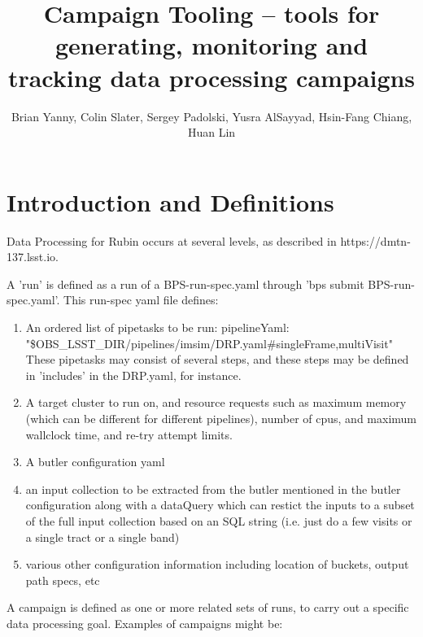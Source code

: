 \documentclass[DM,authoryear,toc]{lsstdoc}
\title{Campaign Tooling -- tools for generating, monitoring and tracking data processing campaigns}
\author{%
Brian Yanny, Colin Slater, Sergey Padolski, Yusra AlSayyad, Hsin-Fang Chiang, Huan Lin
}
\date{\vcsDate}
\begin{document}
\maketitle


\section{Introduction and Definitions}

Data Processing for Rubin occurs at several levels,
as described in https://dmtn-137.lsst.io. 


A 'run' is defined as a run of a BPS-run-spec.yaml through 'bps submit
BPS-run-spec.yaml'.
This run-spec yaml file defines:
\begin{enumerate}

\item An ordered list of pipetasks to be run: 
pipelineYaml: 
"\$OBS\_LSST\_DIR/pipelines/imsim/DRP.yaml\#singleFrame,multiVisit"
These pipetasks may consist of several steps, and these steps may be defined
in 'includes' in the DRP.yaml, for instance.

\item A target cluster to run on, and resource requests such as 
maximum memory (which can be different for different pipelines), number of cpus,
and maximum wallclock time, and re-try attempt limits.

\item A butler configuration yaml

\item an input collection to be extracted from the butler mentioned in
the butler configuration along with a dataQuery which can restict the inputs
to a subset of the full input collection based on 
an SQL string (i.e. just do a few visits or a single tract
or a single band)

\item various other configuration information including location of 
buckets, output path specs, etc

\end{enumerate}

A campaign is defined as one or more related sets of runs, to carry out a
specific data processing goal.  Examples of campaigns might be:
\end{document}
